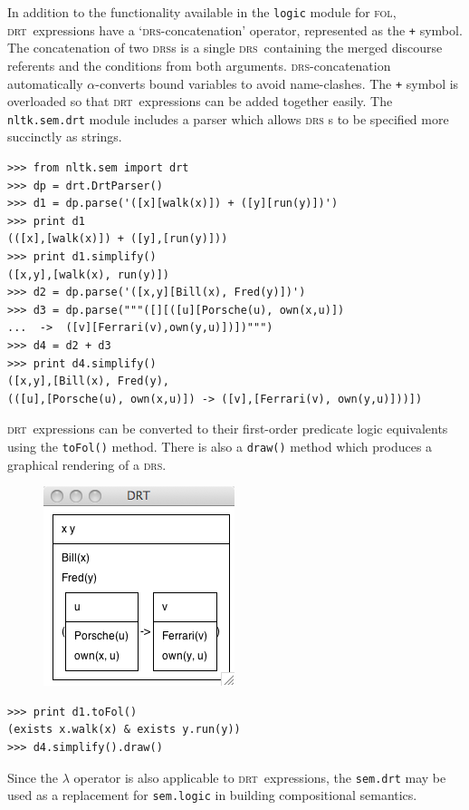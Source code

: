 \documentclass[11pt,a4paper]{article}
\newcommand{\DRS}{\textsc{drs}}
\newcommand{\DRT}{\textsc{drt}}
\newcommand{\FOL}{\textsc{fol}}
\newcommand{\dhgcode}[1]{{\tt #1}}
\begin{document}
In addition to the functionality available in the
\texttt{logic} module for \FOL, \DRT\ expressions have a
`\DRS-concatenation' operator, represented as the \texttt{+} symbol.
The concatenation of two \DRS s is a single \DRS\ containing the
merged discourse referents and the conditions from both arguments.
\DRS-concatenation automatically $\alpha$-converts bound variables to
avoid name-clashes.  The \texttt{+} symbol is overloaded so that \DRT\
expressions can be added together easily. 
The \dhgcode{nltk.sem.drt} module includes a parser which allows \DRS
s to be specified more succinctly as strings.
\begin{verbatim}
>>> from nltk.sem import drt
>>> dp = drt.DrtParser()
>>> d1 = dp.parse('([x][walk(x)]) + ([y][run(y)])')
>>> print d1
(([x],[walk(x)]) + ([y],[run(y)]))
>>> print d1.simplify()
([x,y],[walk(x), run(y)])
>>> d2 = dp.parse('([x,y][Bill(x), Fred(y)])')
>>> d3 = dp.parse("""([][([u][Porsche(u), own(x,u)])
...  ->  ([v][Ferrari(v),own(y,u)])])""")
>>> d4 = d2 + d3
>>> print d4.simplify()
([x,y],[Bill(x), Fred(y),
(([u],[Porsche(u), own(x,u)]) -> ([v],[Ferrari(v), own(y,u)]))])
\end{verbatim}
\DRT\ expressions can be converted to their first-order predicate
logic equivalents using the \dhgcode{toFol()} method. There is also a
\texttt{draw()} method which produces a graphical rendering of a \DRS.
\hfill\\
\begin{figure}
\includegraphics[scale=.5]{drs.png}
\end{figure}

\begin{verbatim}
>>> print d1.toFol()
(exists x.walk(x) & exists y.run(y))
>>> d4.simplify().draw()
\end{verbatim}


Since the $\lambda$ operator is also applicable to \DRT\ expressions,
the \dhgcode{sem.drt} may be used as a replacement for
\dhgcode{sem.logic} in building compositional semantics.
\end{document}
